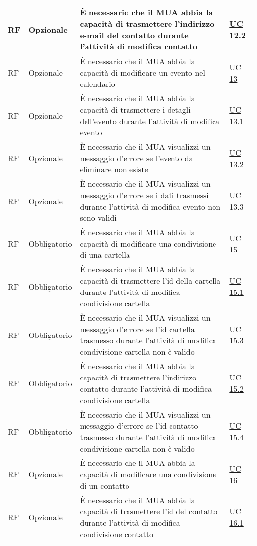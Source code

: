 \begin{longtable}{*{1}{>{\centering\arraybackslash}p{1.5cm}}*{1}{>{\centering\arraybackslash}p{2.5cm}}p{6cm}*{1}{>{\centering\arraybackslash}p{3cm}}}
    \\\hline
    RF & Opzionale & È necessario che il MUA abbia la capacità di trasmettere l'indirizzo e-mail del contatto durante l'attività di modifica contatto & \hyperref[sec:UC12.2]{UC 12.2}
    \\\hline
    RF & Opzionale & È necessario che il MUA abbia la capacità di modificare un evento nel calendario & \hyperref[sec:UC13]{UC 13}
    \\\hline
    RF & Opzionale & È necessario che il MUA abbia la capacità di trasmettere i detagli dell'evento durante l'attività di modifica evento & \hyperref[sec:UC13.1]{UC 13.1}
    \\\hline
    RF & Opzionale & È necessario che il MUA visualizzi un messaggio d'errore se l'evento da eliminare non esiste & \hyperref[sec:UC13.2]{UC 13.2}
    \\\hline
    RF & Opzionale & È necessario che il MUA visualizzi un messaggio d'errore se i dati trasmessi durante l'attività di modifica evento non sono validi & \hyperref[sec:UC13.3]{UC 13.3}
    \\\hline
    RF & Obbligatorio & È necessario che il MUA abbia la capacità di modificare una condivisione di una cartella & \hyperref[sec:UC15]{UC 15}
    \\\hline
    RF & Obbligatorio & È necessario che il MUA abbia la capacità di trasmettere l'id della cartella durante l'attività di modifica condivisione cartella & \hyperref[sec:UC15.1]{UC 15.1}
    \\\hline
    RF & Obbligatorio & È necessario che il MUA visualizzi un messaggio d'errore se l'id cartella trasmesso durante l'attività di modifica condivisione cartella non è valido & \hyperref[sec:UC15.3]{UC 15.3}
    \\\hline
    RF & Obbligatorio & È necessario che il MUA abbia la capacità di trasmettere l'indirizzo contatto durante l'attività di modifica condivisione cartella & \hyperref[sec:UC15.2]{UC 15.2}
    \\\hline
    RF & Obbligatorio & È necessario che il MUA visualizzi un messaggio d'errore se l'id contatto trasmesso durante l'attività di modifica condivisione cartella non è valido & \hyperref[sec:UC15.4]{UC 15.4}
    \\\hline
    RF & Opzionale & È necessario che il MUA abbia la capacità di modificare una condivisione di un contatto & \hyperref[sec:UC16]{UC 16}
    \\\hline
    RF & Opzionale & È necessario che il MUA abbia la capacità di trasmettere l'id del contatto durante l'attività di modifica condivisione contatto & \hyperref[sec:UC16.1]{UC 16.1}

\end{longtable}
